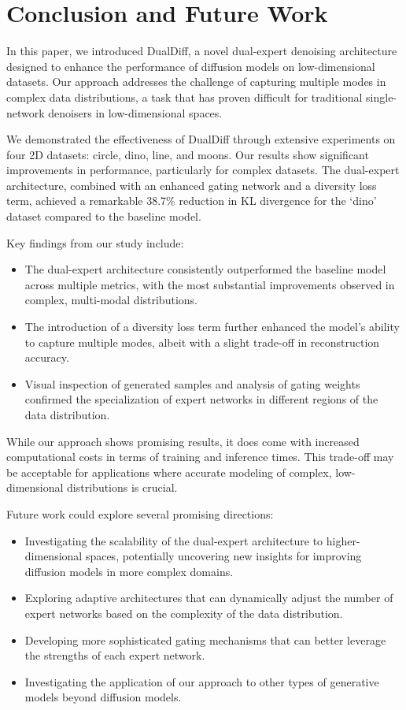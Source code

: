 \documentclass{article} %
\begin{document}
\section{Conclusion and Future Work}
\label{sec:conclusion}

In this paper, we introduced DualDiff, a novel dual-expert denoising architecture designed to enhance the performance of diffusion models on low-dimensional datasets. Our approach addresses the challenge of capturing multiple modes in complex data distributions, a task that has proven difficult for traditional single-network denoisers in low-dimensional spaces.

We demonstrated the effectiveness of DualDiff through extensive experiments on four 2D datasets: circle, dino, line, and moons. Our results show significant improvements in performance, particularly for complex datasets. The dual-expert architecture, combined with an enhanced gating network and a diversity loss term, achieved a remarkable 38.7\% reduction in KL divergence for the `dino' dataset compared to the baseline model.

Key findings from our study include:

\begin{itemize}
    \item The dual-expert architecture consistently outperformed the baseline model across multiple metrics, with the most substantial improvements observed in complex, multi-modal distributions.
    \item The introduction of a diversity loss term further enhanced the model's ability to capture multiple modes, albeit with a slight trade-off in reconstruction accuracy.
    \item Visual inspection of generated samples and analysis of gating weights confirmed the specialization of expert networks in different regions of the data distribution.
\end{itemize}

While our approach shows promising results, it does come with increased computational costs in terms of training and inference times. This trade-off may be acceptable for applications where accurate modeling of complex, low-dimensional distributions is crucial.

Future work could explore several promising directions:

\begin{itemize}
    \item Investigating the scalability of the dual-expert architecture to higher-dimensional spaces, potentially uncovering new insights for improving diffusion models in more complex domains.
    \item Exploring adaptive architectures that can dynamically adjust the number of expert networks based on the complexity of the data distribution.
    \item Developing more sophisticated gating mechanisms that can better leverage the strengths of each expert network.
    \item Investigating the application of our approach to other types of generative models beyond diffusion models.
\end{itemize}
\end{document}
